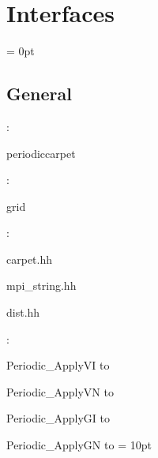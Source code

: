 
\section{Interfaces} 


\parskip = 0pt

\vspace{3mm} \subsection*{General}

: 

periodiccarpet
\vspace{2mm}

: 

grid
\vspace{2mm}

\vspace{5mm}

: 

carpet.hh

mpi\_string.hh

dist.hh
\vspace{2mm}

: 



Periodic\_ApplyVI to 

Periodic\_ApplyVN to 

Periodic\_ApplyGI to 

Periodic\_ApplyGN to 
\vspace{2mm}\parskip = 10pt 
